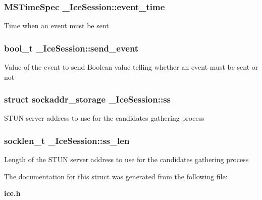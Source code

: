 \subsubsection[{event\_\-time}]{\setlength{\rightskip}{0pt plus 5cm}MSTimeSpec {\bf \_\-IceSession::event\_\-time}}\label{struct__IceSession_a83c3a06f6e91361a29cb20bf4376659e}
Time when an event must be sent 
\subsubsection[{send\_\-event}]{\setlength{\rightskip}{0pt plus 5cm}bool\_\-t {\bf \_\-IceSession::send\_\-event}}\label{struct__IceSession_a661d4e8eacfbc74145b2a78a8a3122f4}
Value of the event to send Boolean value telling whether an event must be sent or not 
\subsubsection[{ss}]{\setlength{\rightskip}{0pt plus 5cm}struct sockaddr\_\-storage {\bf \_\-IceSession::ss}\hspace{0.3cm}{\ttfamily  [read]}}\label{struct__IceSession_a7e08a3862b6b10fed3c0230f1ea17e7e}
STUN server address to use for the candidates gathering process 
\subsubsection[{ss\_\-len}]{\setlength{\rightskip}{0pt plus 5cm}socklen\_\-t {\bf \_\-IceSession::ss\_\-len}}\label{struct__IceSession_af5a3e2cca8b877033aecf8c26b4ba088}
Length of the STUN server address to use for the candidates gathering process 

The documentation for this struct was generated from the following file:\begin{DoxyCompactItemize}
\item 
{\bf ice.h}\end{DoxyCompactItemize}
